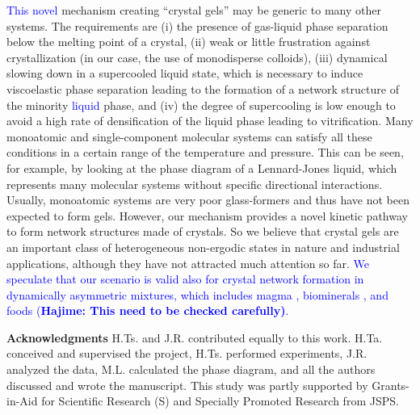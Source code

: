 \documentclass[12pt]{article}
\begin{document}
\textcolor{blue}{This novel} mechanism creating ``crystal gels'' may be generic to many other 
systems. The requirements are (i) the presence of gas-liquid phase separation below the melting point of a crystal, (ii) 
weak or little frustration against crystallization (in our case, the use of monodisperse colloids), 
(iii) dynamical slowing down in a supercooled liquid state, which is necessary to induce viscoelastic phase separation leading to the formation 
of a network structure of the minority \textcolor{blue}{liquid} phase, and (iv) the degree of supercooling is low enough to avoid a high rate of densification of the liquid phase 
leading to vitrification.   
Many monoatomic and single-component molecular systems can satisfy all these conditions in a certain range of the temperature and pressure. 
This can be seen, for example, by looking at the phase diagram of a Lennard-Jones liquid, which represents many molecular systems 
without specific directional interactions. 
Usually, monoatomic systems are very poor glass-formers and thus have not been expected to form gels. 
However, our mechanism provides a novel kinetic pathway to form network structures made of crystals.  
So we believe that crystal gels are an important class of heterogeneous non-ergodic states in nature 
and industrial applications, although they have not attracted much attention so far.  
\textcolor{blue}{We speculate that our scenario is valid also for crystal network formation in dynamically asymmetric mixtures, 
which includes magma \cite{philpotts1998role}, biominerals \cite{rousseau2005multiscale}, and foods \cite{deman1987fat}  
({\bf Hajime: This need to be checked carefully)}. }




\noindent
{\bf Acknowledgments}
\noindent
H.Ts. and J.R. contributed equally to this work. 
H.Ta. conceived and supervised the project, H.Ts. performed experiments, J.R. analyzed the data, M.L. calculated the phase diagram, and all the authors discussed and wrote the manuscript. 
This study was partly supported by Grants-in-Aid for Scientific Research (S) and Specially Promoted Research from JSPS.



\clearpage
\end{document}
